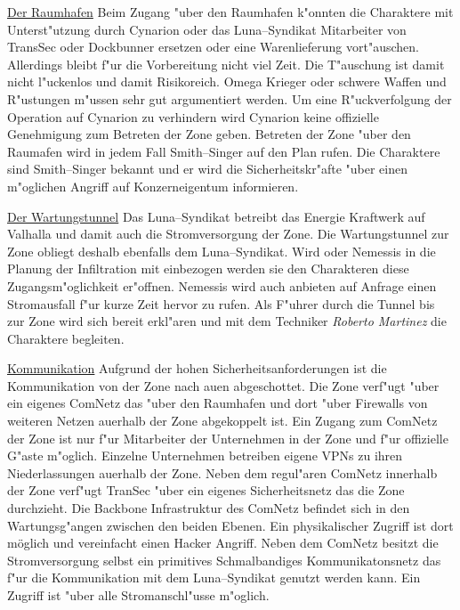 \underline{Der Raumhafen} Beim Zugang "uber den Raumhafen k"onnten die Charaktere mit Unterst"utzung durch Cynarion oder das Luna--Syndikat Mitarbeiter von TransSec oder Dockbunner ersetzen oder eine Warenlieferung vort"auschen. Allerdings bleibt f"ur die Vorbereitung nicht viel Zeit. Die T"auschung ist damit nicht l"uckenlos und damit Risikoreich. Omega Krieger oder schwere Waffen und R"ustungen m"ussen sehr gut argumentiert werden. Um eine R"uckverfolgung der Operation auf Cynarion zu verhindern wird Cynarion keine offizielle Genehmigung zum Betreten der Zone geben. Betreten der Zone "uber den Raumafen wird in jedem Fall Smith--Singer auf den Plan rufen. Die Charaktere sind Smith--Singer bekannt und er wird die Sicherheitskr"afte "uber einen m"oglichen Angriff auf Konzerneigentum informieren. 

\underline{Der Wartungstunnel} Das Luna--Syndikat betreibt das Energie Kraftwerk auf Valhalla und damit auch die Stromversorgung der Zone. Die Wartungstunnel zur Zone obliegt deshalb ebenfalls dem Luna--Syndikat. Wird \xl{} oder Nemessis in die Planung der Infiltration mit einbezogen werden sie den Charakteren diese Zugangsm"oglichkeit er"offnen. Nemessis wird auch anbieten auf Anfrage einen Stromausfall f"ur kurze Zeit hervor zu rufen. Als F"uhrer durch die Tunnel bis zur Zone wird sich \xl{} bereit erkl"aren und mit dem Techniker \emph{Roberto Martinez} die Charaktere begleiten.

\underline{Kommunikation} Aufgrund der hohen Sicherheitsanforderungen ist die Kommunikation von der Zone nach au\3en abgeschottet. Die Zone verf"ugt "uber ein eigenes ComNetz das "uber den Raumhafen und dort "uber Firewalls von weiteren Netzen au\3erhalb der Zone abgekoppelt ist. Ein Zugang zum ComNetz der Zone ist nur f"ur Mitarbeiter der Unternehmen in der Zone und f"ur offizielle G"aste m"oglich. Einzelne Unternehmen betreiben eigene VPNs zu ihren Niederlassungen au\3erhalb der Zone. Neben dem regul"aren ComNetz innerhalb der Zone verf"ugt TranSec "uber ein eigenes Sicherheitsnetz das die Zone durchzieht. Die Backbone Infrastruktur des ComNetz befindet sich in den Wartungsg"angen zwischen den beiden Ebenen. Ein physikalischer Zugriff ist dort möglich und vereinfacht einen Hacker Angriff. Neben dem ComNetz besitzt die Stromversorgung selbst ein primitives Schmalbandiges Kommunikatonsnetz das f"ur die Kommunikation mit dem Luna--Syndikat genutzt werden kann. Ein Zugriff ist "uber alle Stromanschl"usse m"oglich.

